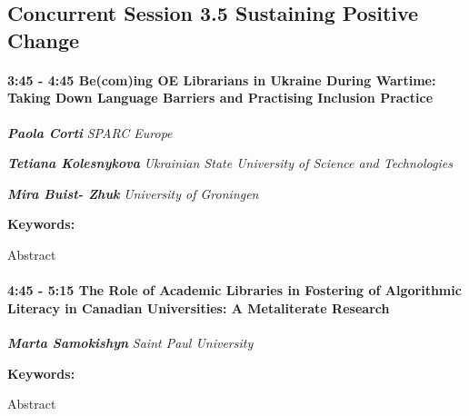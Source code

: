 \documentclass[
]{book}
\begin{document}
\hypertarget{concurrent-session-3.5-sustaining-positive-change}{%
\subsection*{Concurrent Session 3.5 \textbar{} Sustaining Positive Change}\label{concurrent-session-3.5-sustaining-positive-change}}

\begin{session}
\hypertarget{becoming-oe-librarians-in-ukraine-during-wartime-taking-down-language-barriers-and-practising-inclusion-practice}{%
\paragraph*{\texorpdfstring{3:45 - 4:45 \textbar{} \textbf{Be(com)ing OE
Librarians in Ukraine During Wartime: Taking Down Language Barriers and
Practising Inclusion} \textbar{}
Practice}{3:45 - 4:45 \textbar{} Be(com)ing OE Librarians in Ukraine During Wartime: Taking Down Language Barriers and Practising Inclusion \textbar{} Practice}}\label{becoming-oe-librarians-in-ukraine-during-wartime-taking-down-language-barriers-and-practising-inclusion-practice}}

\textbf{\emph{Paola Corti}} \textbar{} \emph{SPARC Europe}

\textbf{\emph{Tetiana Kolesnykova}} \textbar{} \emph{Ukrainian State
University of Science and Technologies}

\textbf{\emph{Mira Buist- Zhuk}} \textbar{} \emph{University of
Groningen}

\textbf{Keywords:}

Abstract
\end{session}

\begin{session}
\hypertarget{the-role-of-academic-libraries-in-fostering-of-algorithmic-literacy-in-canadian-universities-a-metaliterate-research}{%
\paragraph*{\texorpdfstring{4:45 - 5:15 \textbar{} \textbf{The Role of
Academic Libraries in Fostering of Algorithmic Literacy in Canadian
Universities: A Metaliterate} \textbar{}
Research}{4:45 - 5:15 \textbar{} The Role of Academic Libraries in Fostering of Algorithmic Literacy in Canadian Universities: A Metaliterate \textbar{} Research}}\label{the-role-of-academic-libraries-in-fostering-of-algorithmic-literacy-in-canadian-universities-a-metaliterate-research}}

\textbf{\emph{Marta Samokishyn}} \textbar{} \emph{Saint Paul University}

\textbf{Keywords:}

Abstract
\end{session}
\end{document}
